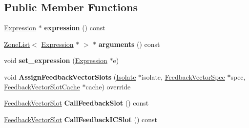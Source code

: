 \subsection*{Public Member Functions}
\begin{DoxyCompactItemize}
\item 
\hyperlink{classv8_1_1internal_1_1_expression}{Expression} $\ast$ {\bfseries expression} () const \hypertarget{classv8_1_1internal_1_1_call_afca67643ccf4ef366d6fff5aa0cc3f63}{}\label{classv8_1_1internal_1_1_call_afca67643ccf4ef366d6fff5aa0cc3f63}

\item 
\hyperlink{classv8_1_1internal_1_1_zone_list}{Zone\+List}$<$ \hyperlink{classv8_1_1internal_1_1_expression}{Expression} $\ast$ $>$ $\ast$ {\bfseries arguments} () const \hypertarget{classv8_1_1internal_1_1_call_abb3b1fd80091c0ea4e652d5b3f2027ee}{}\label{classv8_1_1internal_1_1_call_abb3b1fd80091c0ea4e652d5b3f2027ee}

\item 
void {\bfseries set\+\_\+expression} (\hyperlink{classv8_1_1internal_1_1_expression}{Expression} $\ast$e)\hypertarget{classv8_1_1internal_1_1_call_a10e1e6e4100c722bc362ec1ac9febc3d}{}\label{classv8_1_1internal_1_1_call_a10e1e6e4100c722bc362ec1ac9febc3d}

\item 
void {\bfseries Assign\+Feedback\+Vector\+Slots} (\hyperlink{classv8_1_1internal_1_1_isolate}{Isolate} $\ast$isolate, \hyperlink{classv8_1_1internal_1_1_feedback_vector_spec}{Feedback\+Vector\+Spec} $\ast$spec, \hyperlink{classv8_1_1internal_1_1_feedback_vector_slot_cache}{Feedback\+Vector\+Slot\+Cache} $\ast$cache) override\hypertarget{classv8_1_1internal_1_1_call_a3c46b41cc2473cb7c57744c6a53a79f7}{}\label{classv8_1_1internal_1_1_call_a3c46b41cc2473cb7c57744c6a53a79f7}

\item 
\hyperlink{classv8_1_1internal_1_1_feedback_vector_slot}{Feedback\+Vector\+Slot} {\bfseries Call\+Feedback\+Slot} () const \hypertarget{classv8_1_1internal_1_1_call_a13b18cf7a23792a9d65e7d1f007db078}{}\label{classv8_1_1internal_1_1_call_a13b18cf7a23792a9d65e7d1f007db078}

\item 
\hyperlink{classv8_1_1internal_1_1_feedback_vector_slot}{Feedback\+Vector\+Slot} {\bfseries Call\+Feedback\+I\+C\+Slot} () const \hypertarget{classv8_1_1internal_1_1_call_a968f1984bc2026ff767f821caa3e07e4}{}\label{classv8_1_1internal_1_1_call_a968f1984bc2026ff767f821caa3e07e4}


\end{DoxyCompactItemize}
